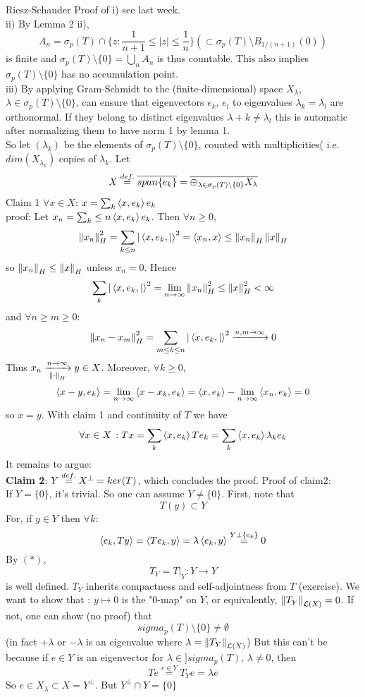 \documentclass{article}
\begin{document}
\begin{pf}{Riesz-Schauder}{}
	Proof of i) see last week.\\
	ii) By Lemma 2 ii),
	$$A_n=\sigma_p(T)\cap\{z:\frac{1}{n+1}\leq|z|\leq\frac{1}{n}\}(\subset \sigma_p(T)\setminus B_{1/(n+1)}(0))$$
	is finite and $\sigma_p(T)\setminus\{0\}=\bigcup_n A_n$ is thus countable. This also implies $\sigma_p(T)\setminus\{0\}$ has no accumulation point.\\
	iii) By applying Gram-Schmidt to the (finite-dimensional) space $X_\lambda$, $\lambda\in\sigma_p(T)\setminus\{0\}$, can ensure that eigenvectors $e_k$, $e_l$ to eigenvalues $\lambda_k=\lambda_l$ are orthonormal. If they belong
	to distinct eigenvalues $\lambda+k\neq\lambda_l$ this is automatic after normalizing them to have norm 1 by lemma 1.\\
	So let $(\lambda_k)$ be the elements of $\sigma_p(T)\setminus\{0\}$, counted with multiplicities( i.e. $dim(X_{\lambda_k})$ copies of $\lambda_k$. Let
	$$
		X\stackrel{def.}{=}\overline{span\{e_k\}}=\overline{\oplus_{\lambda\in\sigma_p(T)\setminus\{0\}}X_\lambda}
	$$
	Claim 1 $\forall x\in X$: $x=\sum_k \left<{x},{e_k}\right>e_k$\\
	proof: Let $x_n=\sum_k\leq n \left<{x},{e_k}\right>e_k$.
	Then $\forall n\geq0$,
	$$
		\left\|{x_n}\right\|_H^2=\sum_{k\leq n}|\left<{x,e_k},{|}\right>^2=\left<{x_n},{x}\right>\leq\left\|{x_n}\right\|_H\left\|{x}\right\|_H$$
	so $\left\|{x_n}\right\|_H\leq\left\|{x}\right\|_H$ unless $x_n=0$. Hence
	$$\sum_{k}|\left<{x,e_k},{|}\right>^2=\lim_{n\to\infty}\left\|{x_n}\right\|_H^2\leq\left\|{x}\right\|_H^2<\infty$$
	and $\forall n\geq m\geq0$:
	$$\left\|{x_n-x_m}\right\|^2_H=\sum_{m\leq k\leq n}|\left<{x,e_k},{|}\right>^2\xrightarrow{n,m\to\infty}0$$
	Thus $x_n\xrightarrow[\left\|{\cdot}\right\|_H]{n\to\infty}y\in X$. Moreover, $\forall k\geq 0$,
	$$\left<{x-y},{e_k}\right>=\lim_{n\to\infty}\left<{x-x_k},{e_k}\right>=\left<{x},{e_k}\right>-\lim_{n\to\infty}\left<{x_n},{e_k}\right>=0$$
	so $x=y$. With claim 1 and continuity of $T$ we have
	$$\forall x\in X\,: Tx=\sum_k \left<{x},{e_k}\right>Te_k=\sum_k \left<{x},{e_k}\right>\lambda_ke_k$$
	It remains to argue:\\
	{\bf Claim 2}: $Y\stackrel{def.}{=} X^\perp=ker(T)$, which concludes the proof.
	Proof of claim2:\\
	If $Y=\{0\}$, it's trivial. So one can assume $Y\neq\{0\}$. First, note that
	\begin{equation}T(y)\subset Y\tag{$*$}\end{equation}
	For, if $y\in Y$ then $\forall k$:
	\[\left<{e_k},{Ty}\right>=\left<{Te_k},{y}\right>=\lambda\left<{e_k},{y}\right>\stackrel{Y\perp\{e_k\}}{=}0\]
	By $(*)$,
	\[T_Y=T|_Y:Y\to Y\] is well defined. $T_Y$ inherits compactness and self-adjointness from $T$ (exercise). We want to show that : $y\mapsto0 $ is the  "0-map" on $Y$, or equivalently, $\left\|{T_Y}\right\|_{\mathcal{L}(X)}=0$. If not, one can show (no proof) that
	\[sigma_p(T)\setminus\{0\}\neq\emptyset\]
	(in fact $+\lambda$ or $-\lambda$ is an eigenvalue where $\lambda=\left\|{T_Y}\right\|_{\mathcal{L}(X)}$) But this can't be because if $e\in Y$ is an eigenvector for $\lambda\in]sigma_p(T)$, $\lambda\neq 0$, then
	\[Te\stackrel{e\in Y}{=}T_Y e=\lambda e\]
	So $e\in X_\lambda\subset X=Y^\perp$. But $Y^\perp\cap Y=\{0\}$
\end{pf}
\end{document}
